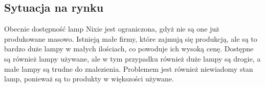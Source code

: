 \documentclass[../main.tex]{subfiles}
\begin{document}
\subsection{Sytuacja na rynku}
Obecnie dostępność lamp Nixie jest ograniczona, gdyż nie są one już produkowane masowo. Istnieją małe firmy, które zajmują się produkcją, ale są to bardzo
duże lampy w małych ilościach, co powoduje ich wysoką cenę. Dostępne są również lampy używane, ale w tym przypadku również duże lampy są drogie, a małe lampy są trudne do znalezienia.
Problemem jest również niewiadomy stan lamp, ponieważ są to produkty w większości używane.
\end{document}

